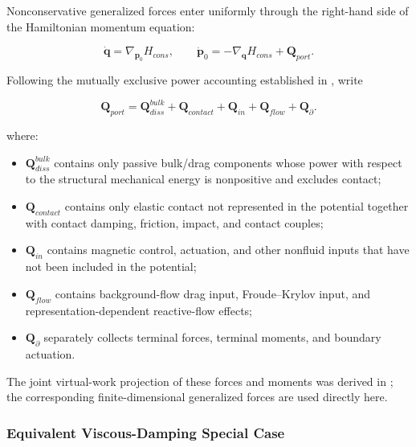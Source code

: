 Nonconservative generalized forces enter uniformly through the right-hand side of the Hamiltonian momentum equation:

\begin{equation}
\label{eq:hamiltonian-3-31}
\boxed{\dot{\mathbf{q}} = \nabla_{\mathbf{p}_{0}}H_{cons},\quad\quad{\dot{\mathbf{p}}}_{0} = - \nabla_{\mathbf{q}}H_{cons} + \mathbf{Q}_{port}.}
\end{equation}

Following the mutually exclusive power accounting established in , write

\begin{equation}
\label{eq:hamiltonian-3-32}
\boxed{\mathbf{Q}_{port} = \mathbf{Q}_{diss}^{bulk} + \mathbf{Q}_{contact} + \mathbf{Q}_{in} + \mathbf{Q}_{flow} + \mathbf{Q}_{\partial}.}
\end{equation}

where:

\begin{itemize}
\tightlist
\item
  \(\mathbf{Q}_{diss}^{bulk}\) contains only passive bulk/drag components whose power with respect to the structural mechanical energy is nonpositive and excludes contact;
\item
  \(\mathbf{Q}_{contact}\) contains only elastic contact not represented in the potential together with contact damping, friction, impact, and contact couples;
\item
  \(\mathbf{Q}_{in}\) contains magnetic control, actuation, and other nonfluid inputs that have not been included in the potential;
\item
  \(\mathbf{Q}_{flow}\) contains background-flow drag input, Froude--Krylov input, and representation-dependent reactive-flow effects;
\item
  \(\mathbf{Q}_{\partial}\) separately collects terminal forces, terminal moments, and boundary actuation.
\end{itemize}

The joint virtual-work projection of these forces and moments was derived in ; the corresponding finite-dimensional generalized forces are used directly here.

\subsubsection{Equivalent Viscous-Damping Special Case}\label{sec:hamiltonian-3-4-2}

